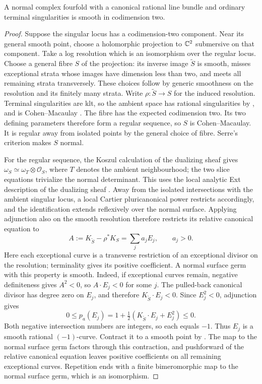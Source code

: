 \begin{lemma}\label{lem:terminal-smooth}
A normal complex fourfold with a canonical rational line bundle
and ordinary terminal singularities is smooth in codimension two.
\end{lemma}

\begin{proof}
Suppose the singular locus has a codimension-two component.
Near its general smooth point, choose a holomorphic projection
to $\mathbb C^2$ submersive on that component. Take a log resolution
which is an isomorphism over the regular locus. Choose a general
fibre $S$ of the projection: its inverse image $\widetilde S$
is smooth, misses exceptional strata whose images have dimension
less than two, and meets all remaining strata transversely. These
choices follow by generic smoothness on the resolution and its
finitely many strata.
Write $\rho:\widetilde S\to S$ for the induced resolution. Terminal
singularities are klt, so the ambient space has rational singularities
by \cite[Theorem~3.12]{FujinoAnalytic2022}, and is Cohen--Macaulay
\cite[Remark~2.1]{Greb2011}. The fibre has the expected codimension
two. Its two defining parameters therefore form a regular sequence,
so $S$ is Cohen--Macaulay. It is regular away from isolated points
by the general choice of fibre. Serre's criterion makes $S$ normal.

For the regular sequence, the Koszul calculation of the dualizing
sheaf gives $\omega_S\simeq\omega_T\otimes\mathcal O_S$, where
$T$ denotes the ambient neighbourhood; the two slice equations
trivialize the normal determinant. This uses the local analytic
Ext description of the dualizing sheaf
\cite[pp.~3--4]{RSW2017}. Away from the isolated intersections with
the ambient singular locus, a local Cartier pluricanonical power
restricts accordingly, and the identification extends reflexively
over the normal surface. Applying adjunction also on the smooth
resolution therefore restricts its relative canonical equation to
\[
 A:=K_{\widetilde S}-\rho^*K_S=\sum_j a_jE_j,
 \qquad a_j>0.
\]
Here each exceptional curve is a transverse restriction of an
exceptional divisor on the resolution; terminality gives its
positive coefficient.
A normal surface germ with this property is smooth. Indeed, if
exceptional curves remain, negative definiteness
\cite[Section~4.8(e)]{Grauert1962} gives $A^2<0$,
so $A\cdot E_j<0$ for some $j$. The pulled-back canonical divisor
has degree zero on $E_j$, and therefore
$K_{\widetilde S}\cdot E_j<0$. Since $E_j^2<0$, adjunction gives
\[
 0\leq p_a(E_j)
   =1+\tfrac12(K_{\widetilde S}\cdot E_j+E_j^2)\leq0.
\]
Both negative intersection numbers are integers, so each equals
$-1$. Thus $E_j$ is a smooth rational $(-1)$-curve. Contract it
to a smooth point by \cite[Section~4.8(a)]{Grauert1962}. The map to
the normal surface germ factors
through this contraction, and pushforward of the relative
canonical equation leaves positive coefficients on all remaining
exceptional curves. Repetition ends with a finite bimeromorphic
map to the normal surface germ, which is an isomorphism.


\end{proof}
